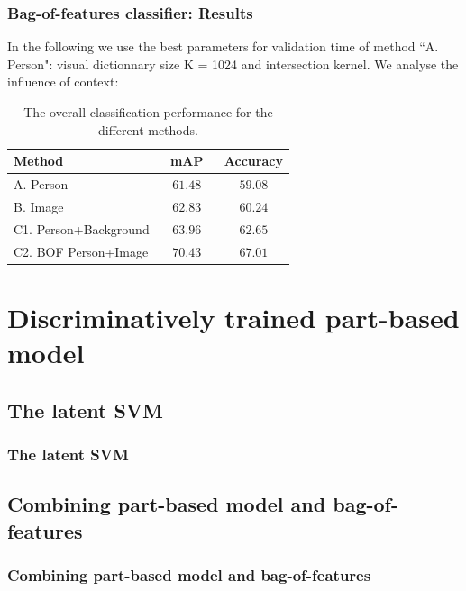 \documentclass{beamer}
\begin{document}

\begin{frame}
\frametitle{Bag-of-features classifier: Results}

In the following we use the best parameters for validation time of method ``A. Person": visual dictionnary size K = 1024 and intersection kernel.
We analyse the influence of context:

\begin{table}[tbp]
\centering
\begin{tabular}{|l|c|c|}
\hline
 Method                   &$~~~$mAP$~~~$&  Accuracy  \\ \hline 
 A.  Person          &  $61.48$ &  $59.08$ \\ \hline 
 B.  Image           &  $62.83$ &  $60.24 $ \\ \hline 
 C1. Person+Background&  $63.96$ &  $62.65$ \\ \hline 
 C2. BOF Person+Image     &  $70.43$ &  $67.01$ \\ \hline 
\end{tabular}
\caption{The overall classification performance for the different methods.}
\label{tab:methods}
\end{table}


\end{frame}

\section{Discriminatively trained part-based model}
\begin{frame}
\tableofcontents[currentsection]
\end{frame}

\subsection{The latent SVM}
\begin{frame}
\frametitle{The latent SVM}

\end{frame}

\subsection{Combining part-based model and bag-of-features}
\begin{frame}
\frametitle{Combining part-based model and bag-of-features}

\end{frame}
\end{document}
